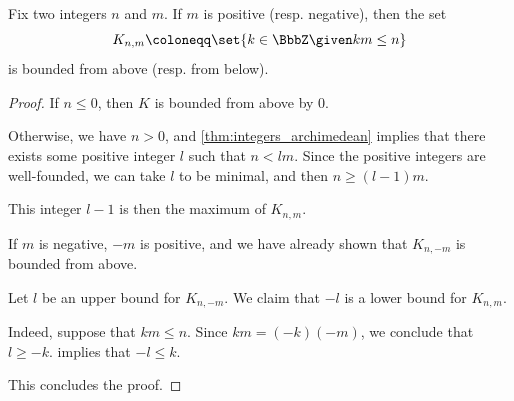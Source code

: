 \begin{lemma}\label{thm:integer_division_boundedness_lemma}
  Fix two integers \( n \) and \( m \). If \( m \) is positive (resp. negative), then the set
  \begin{equation}\label{eq:thm:integer_division_boundedness_lemma}
    K_{n,m} \coloneqq \set{ k \in \BbbZ \given km \leq n }
  \end{equation}
  is bounded from above (resp. from below).
\end{lemma}
\begin{proof}
   If \( n \leq 0 \), then \( K \) is bounded from above by \( 0 \).

  Otherwise, we have \( n > 0 \), and \cref{thm:integers_archimedean} implies that there exists some positive integer \( l \) such that \( n < lm \). Since the positive integers are well-founded, we can take \( l \) to be minimal, and then \( n \geq (l - 1)m \).

  This integer \( l - 1 \) is then the maximum of \( K_{n,m} \).

   If \( m \) is negative, \( -m \) is positive, and we have already shown that \( K_{n,-m} \) is bounded from above.

  Let \( l \) be an upper bound for \( K_{n,-m} \). We claim that \( -l \) is a lower bound for \( K_{n,m} \).

  Indeed, suppose that \( km \leq n \). Since \( km = (-k)(-m) \), we conclude that \( l \geq -k \).  implies that \( -l \leq k \).

  This concludes the proof.
\end{proof}

